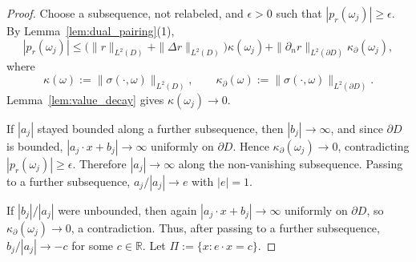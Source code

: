\documentclass[11pt]{amsart}
\theoremstyle{definition}
\theoremstyle{remark}
\begin{document}
\begin{proof}
Choose a subsequence, not relabeled, and $\epsilon>0$ such that
$|p_r(\omega_j)|\ge\epsilon$. By Lemma~\ref{lem:dual_pairing}(1),
\begin{equation*}
	|p_r(\omega_j)|
	\le
	\big(\|r\|_{L^2(D)}+\|\Delta r\|_{L^2(D)}\big)\kappa(\omega_j)
	+
	\|\partial_n r\|_{L^2(\partial D)}\kappa_\partial(\omega_j),
\end{equation*}
where
\begin{equation*}
	\kappa(\omega):=\|\sigma(\cdot,\omega)\|_{L^2(D)},\qquad
	\kappa_\partial(\omega):=\|\sigma(\cdot,\omega)\|_{L^2(\partial D)}.
\end{equation*}
Lemma~\ref{lem:value_decay} gives $\kappa(\omega_j)\to0$.

If $|a_j|$ stayed bounded along a further subsequence, then
$|b_j|\to\infty$, and since $\partial D$ is bounded,
$|a_j\cdot x+b_j|\to\infty$ uniformly on $\partial D$. Hence
$\kappa_\partial(\omega_j)\to0$, contradicting
$|p_r(\omega_j)|\ge\epsilon$. Therefore $|a_j|\to\infty$ along the
non-vanishing subsequence. Passing to a further subsequence,
$a_j/|a_j|\to e$ with $|e|=1$.

If $|b_j|/|a_j|$ were unbounded, then again
$|a_j\cdot x+b_j|\to\infty$ uniformly on $\partial D$, so
$\kappa_\partial(\omega_j)\to0$, a contradiction. Thus, after passing to a
further subsequence, $b_j/|a_j|\to -c$ for some $c\in\mathbb{R}$.
Let $\Pi:=\{x:e\cdot x=c\}$.


\end{proof}
\end{document}
